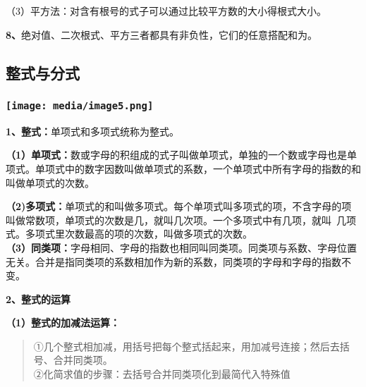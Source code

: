 \documentclass[a4paper,11pt,UTF8]{ctexart}
\begin{document}
（3）平方法：对含有根号的式子可以通过比较平方数的大小得根式大小。

\textbf{8、}绝对值、二次根式、平方三者都具有非负性，它们的任意搭配和为。

\hypertarget{ux6574ux5f0fux4e0eux5206ux5f0f}{%
\subsection{\texorpdfstring{
整式与分式}{ 整式与分式}}\label{ux6574ux5f0fux4e0eux5206ux5f0f}}

\hypertarget{ux5b66ux79d1ux7f51www.zxxk.com--ux6559ux80b2ux8d44ux6e90ux95e8ux6237ux63d0ux4f9bux8bd5ux9898ux8bd5ux5377ux6559ux6848ux8bfeux4ef6ux6559ux5b66ux8bbaux6587ux7d20ux6750ux7b49ux5404ux7c7bux6559ux5b66ux8d44ux6e90ux5e93ux4e0bux8f7dux8fd8ux6709ux5927ux91cfux4e30ux5bccux7684ux6559ux5b66ux8d44ux8baf-2}{%
\subsubsection{\texorpdfstring{\protect\texttt{[image: media/image5.png]}}{学科网(www.zxxk.com)-\/-教育资源门户，提供试题试卷、教案、课件、教学论文、素材等各类教学资源库下载，还有大量丰富的教学资讯！}}\label{ux5b66ux79d1ux7f51www.zxxk.com--ux6559ux80b2ux8d44ux6e90ux95e8ux6237ux63d0ux4f9bux8bd5ux9898ux8bd5ux5377ux6559ux6848ux8bfeux4ef6ux6559ux5b66ux8bbaux6587ux7d20ux6750ux7b49ux5404ux7c7bux6559ux5b66ux8d44ux6e90ux5e93ux4e0bux8f7dux8fd8ux6709ux5927ux91cfux4e30ux5bccux7684ux6559ux5b66ux8d44ux8baf-2}}

\textbf{1、整式：}单项式和多项式统称为整式。

\textbf{（1）单项式：}数或字母的积组成的式子叫做单项式，单独的一个数或字母也是单项式。单项式中的数字因数叫做单项式的系数，一个单项式中所有字母的指数的和叫做单项式的次数。

\textbf{（2)多项式：}单项式的和叫做多项式。每个单项式叫多项式的项，不含字母的项叫做常数项，单项式的次数是几，就叫几次项。一个多项式中有几项，就叫~几项式。多项式里次数最高的项的次数，叫做多项式的次数。\\
\textbf{（3）同类项：}字母相同、字母的指数也相同叫同类项。同类项与系数、字母位置无关。合并是指同类项的系数相加作为新的系数，同类项的字母和字母的指数不变。

\textbf{2、整式的运算}

\textbf{（1）整式的加减法运算：}

\begin{quote}
①几个整式相加减，用括号把每个整式括起来，用加减号连接；然后去括号、合并同类项。\\
②化简求值的步骤：去括号合并同类项化到最简代入特殊值
\end{quote}
\end{document}
